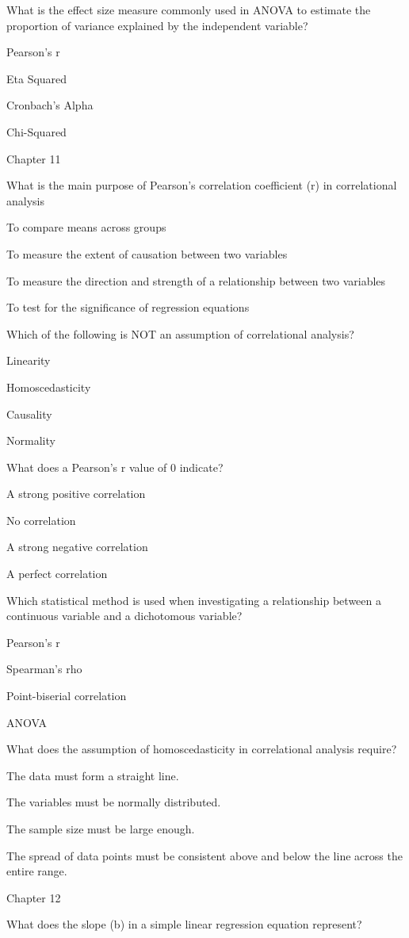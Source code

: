 \documentclass[
  letterpaper,
  DIV=11,
  numbers=noendperiod]{scrreprt}
\begin{document}
What is the effect size measure commonly used in ANOVA to estimate the
proportion of variance explained by the independent variable?

Pearson's r

Eta Squared

Cronbach's Alpha

Chi-Squared

Chapter 11

What is the main purpose of Pearson's correlation coefficient (r) in
correlational analysis

To compare means across groups

To measure the extent of causation between two variables

To measure the direction and strength of a relationship between two
variables

To test for the significance of regression equations

Which of the following is NOT an assumption of correlational analysis?

Linearity

Homoscedasticity

Causality

Normality

What does a Pearson's r value of 0 indicate?

A strong positive correlation

No correlation

A strong negative correlation

A perfect correlation

Which statistical method is used when investigating a relationship
between a continuous variable and a dichotomous variable?

Pearson's r

Spearman's rho

Point-biserial correlation

ANOVA

What does the assumption of homoscedasticity in correlational analysis
require?

The data must form a straight line.

The variables must be normally distributed.

The sample size must be large enough.

The spread of data points must be consistent above and below the line
across the entire range.

Chapter 12

What does the slope (b) in a simple linear regression equation
represent?
\end{document}
